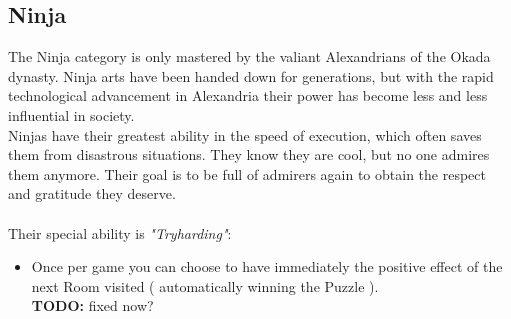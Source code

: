 \subsection{Ninja}


The Ninja category is only mastered by the valiant Alexandrians of the Okada dynasty. Ninja arts have been handed down for generations, but with the rapid technological advancement in Alexandria their power has become less and less influential in society. \\
Ninjas have their greatest ability in the speed of execution, which often saves them from disastrous situations. They know they are cool, but no one admires them anymore. Their goal is to be full of admirers again to obtain the respect and gratitude they deserve.\\\\
Their special ability is \textit{"Tryharding"}:
\begin{itemize}
\item Once per game you can choose to have immediately the positive effect of the next Room visited ( automatically winning the Puzzle ). \\\textbf{TODO:} fixed now?
\end{itemize}


